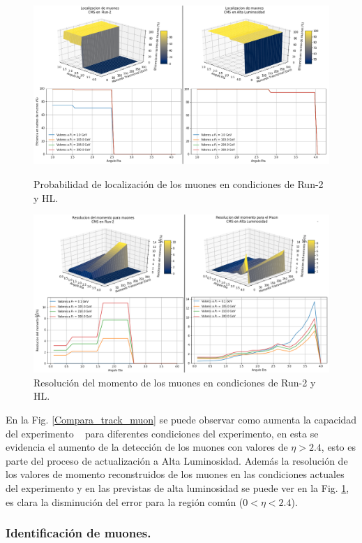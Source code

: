 \begin{figure}[h!]
\centering
\includegraphics[width=.9\textwidth]{Analisis_y_Resultados/imagenes/Tracking_of_Muon.png}
\caption{Probabilidad de localización de los muones en condiciones de Run-2 y HL.}
\label{Compara_track_muon}
\includegraphics[width=.9\textwidth]{Analisis_y_Resultados/imagenes/Momentum_resolution_of_Muon.png}
\caption{Resolución del momento de los muones en condiciones de Run-2 y HL.}
\label{Compara_sol_muon}
\end{figure}
En la Fig. \ref{Compara_track_muon} se puede observar como aumenta la capacidad del experimento \CMS ~ para diferentes condiciones del experimento, en esta se evidencia el aumento de la detección de los muones con valores de $\eta > 2.4$, esto es parte del proceso de actualización a Alta Luminosidad. Además la resolución de los valores de momento reconstruidos de los muones en las condiciones actuales del experimento y en las previstas de alta luminosidad se puede ver en la Fig. \ref{Compara_sol_muon}, es clara la disminución del error para la región común ($0<\eta < 2.4$).

\subsubsection{Identificación de muones.}

